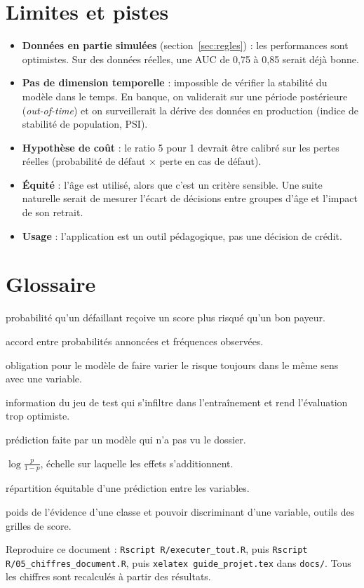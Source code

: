 \documentclass[11pt,a4paper]{article}
\newcommand{\code}[1]{\texttt{#1}}
\begin{document}
\section{Limites et pistes}
\begin{itemize}
\item \textbf{Données en partie simulées} (section~\ref{sec:regles}) : les performances sont optimistes. Sur des données réelles, une AUC de 0,75 à 0,85 serait déjà bonne.
\item \textbf{Pas de dimension temporelle} : impossible de vérifier la stabilité du modèle dans le temps. En banque, on validerait sur une période postérieure (\emph{out-of-time}) et on surveillerait la dérive des données en production (indice de stabilité de population, PSI).
\item \textbf{Hypothèse de coût} : le ratio 5 pour 1 devrait être calibré sur les pertes réelles (probabilité de défaut $\times$ perte en cas de défaut).
\item \textbf{Équité} : l'âge est utilisé, alors que c'est un critère sensible. Une suite naturelle serait de mesurer l'écart de décisions entre groupes d'âge et l'impact de son retrait.
\item \textbf{Usage} : l'application est un outil pédagogique, pas une décision de crédit.
\end{itemize}

\section{Glossaire}
\begin{description}[style=nextline, leftmargin=1.2em, font=\sffamily\bfseries\color{bleu}]
\item[AUC] probabilité qu'un défaillant reçoive un score plus risqué qu'un bon payeur.
\item[Calibration] accord entre probabilités annoncées et fréquences observées.
\item[Contrainte de monotonie] obligation pour le modèle de faire varier le risque toujours dans le même sens avec une variable.
\item[Fuite d'information] information du jeu de test qui s'infiltre dans l'entraînement et rend l'évaluation trop optimiste.
\item[Hors pli] prédiction faite par un modèle qui n'a pas vu le dossier.
\item[Log-cote] $\log\frac{p}{1-p}$, échelle sur laquelle les effets s'additionnent.
\item[Valeurs de Shapley] répartition équitable d'une prédiction entre les variables.
\item[WoE / IV] poids de l'évidence d'une classe et pouvoir discriminant d'une variable, outils des grilles de score.
\end{description}

\vspace{1em}
{\small\color{gris} Reproduire ce document : \code{Rscript R/executer\_tout.R}, puis \code{Rscript R/05\_chiffres\_document.R}, puis \code{xelatex guide\_projet.tex} dans \code{docs/}. Tous les chiffres sont recalculés à partir des résultats.}
\end{document}
